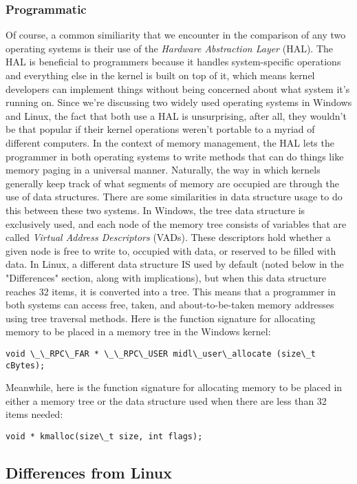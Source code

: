 \documentclass[letterpaper,10pt,titlepage]{article}
\begin{document}
\subsubsection{Programmatic}
Of course, a common similiarity that we encounter in the comparison of any two operating systems is their use of the \emph{Hardware Abstraction Layer} (HAL). The HAL is beneficial to programmers because it handles system-specific operations and everything else in the kernel is built on top of it, which means kernel developers can implement things without being concerned about what system it's running on. Since we're discussing two widely used operating systems in Windows and Linux, the fact that both use a HAL is unsurprising, after all, they wouldn't be that popular if their kernel operations weren't portable to a myriad of different computers. In the context of memory management, the HAL lets the programmer in both operating systems to write methods that can do things like memory paging in a universal manner. 
Naturally, the way in which kernels generally keep track of what segments of memory are occupied are through the use of data structures. There are some similarities in data structure usage to do this between these two systems. In Windows, the tree data structure is exclusively used, and each node of the memory tree consists of variables that are called \emph{Virtual Address Descriptors} (VADs). These descriptors hold whether a given node is free to write to, occupied with data, or reserved to be filled with data. In Linux, a different data structure IS used by default (noted below in the "Differences" section, along with implications), but when this data structure reaches 32 items, it is converted into a tree. This means that a programmer in both systems can access free, taken, and about-to-be-taken memory addresses using tree traversal methods.
Here is the function signature for allocating memory to be placed in a memory tree in the Windows kernel:
\begin{lstlisting}
void \_\_RPC\_FAR * \_\_RPC\_USER midl\_user\_allocate (size\_t cBytes);
\end{lstlisting}

Meanwhile, here is the function signature for allocating memory to be placed in either a memory tree or the data structure used when there are less than 32 items needed:
\begin{lstlisting}
void * kmalloc(size\_t size, int flags);
\end{lstlisting}
\subsection{Differences from Linux}
\end{document}
